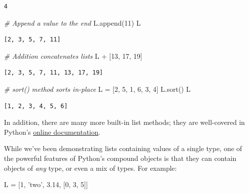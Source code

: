 \documentclass[]{article}
\newenvironment{Shaded}{}{}
\newcommand{\DecValTok}[1]{\textcolor[rgb]{0.25,0.63,0.44}{{#1}}}
\newcommand{\FloatTok}[1]{\textcolor[rgb]{0.25,0.63,0.44}{{#1}}}
\newcommand{\StringTok}[1]{\textcolor[rgb]{0.25,0.44,0.63}{{#1}}}
\newcommand{\CommentTok}[1]{\textcolor[rgb]{0.38,0.63,0.69}{\textit{{#1}}}}
\newcommand{\OperatorTok}[1]{\textcolor[rgb]{0.40,0.40,0.40}{{#1}}}
\newcommand{\NormalTok}[1]{{#1}}
\begin{document}
\begin{verbatim}
4
\end{verbatim}

\begin{Shaded}
\begin{Highlighting}[]
\CommentTok{# Append a value to the end}
\NormalTok{L.append(}\DecValTok{11}\NormalTok{)}
\NormalTok{L}
\end{Highlighting}
\end{Shaded}

\begin{verbatim}
[2, 3, 5, 7, 11]
\end{verbatim}

\begin{Shaded}
\begin{Highlighting}[]
\CommentTok{# Addition concatenates lists}
\NormalTok{L }\OperatorTok{+} \NormalTok{[}\DecValTok{13}\NormalTok{, }\DecValTok{17}\NormalTok{, }\DecValTok{19}\NormalTok{]}
\end{Highlighting}
\end{Shaded}

\begin{verbatim}
[2, 3, 5, 7, 11, 13, 17, 19]
\end{verbatim}

\begin{Shaded}
\begin{Highlighting}[]
\CommentTok{# sort() method sorts in-place}
\NormalTok{L }\OperatorTok{=} \NormalTok{[}\DecValTok{2}\NormalTok{, }\DecValTok{5}\NormalTok{, }\DecValTok{1}\NormalTok{, }\DecValTok{6}\NormalTok{, }\DecValTok{3}\NormalTok{, }\DecValTok{4}\NormalTok{]}
\NormalTok{L.sort()}
\NormalTok{L}
\end{Highlighting}
\end{Shaded}

\begin{verbatim}
[1, 2, 3, 4, 5, 6]
\end{verbatim}

In addition, there are many more built-in list methods; they are
well-covered in Python's
\href{https://docs.python.org/3/tutorial/datastructures.html}{online
documentation}.

While we've been demonstrating lists containing values of a single type,
one of the powerful features of Python's compound objects is that they
can contain objects of \emph{any} type, or even a mix of types. For
example:

\begin{Shaded}
\begin{Highlighting}[]
\NormalTok{L }\OperatorTok{=} \NormalTok{[}\DecValTok{1}\NormalTok{, }\StringTok{'two'}\NormalTok{, }\FloatTok{3.14}\NormalTok{, [}\DecValTok{0}\NormalTok{, }\DecValTok{3}\NormalTok{, }\DecValTok{5}\NormalTok{]]}
\end{Highlighting}
\end{Shaded}
\end{document}
